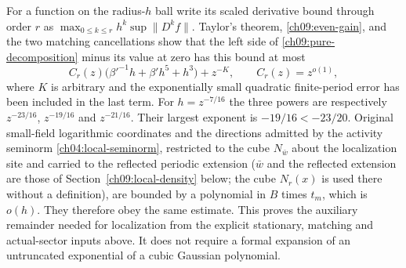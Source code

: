 For a function on the radius-$h$ ball write its scaled derivative
bound through order $r$ as
$\max_{0\le k\le r}h^k\sup\|D^kf\|$.
Taylor's theorem, \eqref{ch09:even-gain}, and the two matching
cancellations show that the left side of
\eqref{ch09:pure-decomposition} minus its value at zero has this bound at most
\begin{equation}
 C_r(z)\bigl(\beta'^{-1}h+\beta'h^5+h^3\bigr)+z^{-K},
 \qquad C_r(z)=z^{o(1)},
 \label{ch09:pure-small-bound}
\end{equation}
where $K$ is arbitrary and the exponentially small quadratic
finite-period error has been included in the last term.
For $h=z^{-7/16}$ the three powers are respectively
$z^{-23/16}$, $z^{-19/16}$ and $z^{-21/16}$.
Their largest exponent is $-19/16<-23/20$.
Original small-field logarithmic coordinates and the directions admitted by the activity
seminorm \eqref{ch04:local-seminorm}, restricted to the cube $N_{\bar w}$ about the localization site and carried to the reflected periodic extension ($\bar w$ and the reflected extension are those of Section~\ref{ch09:local-density} below; the cube $N_r(x)$ is used there without a definition), are bounded by a polynomial in $B$ times
$t_m$, which is $o(h)$. They therefore obey the same estimate.
This proves the auxiliary remainder needed for localization from
the explicit stationary, matching and actual-sector inputs above.
It does not require a formal expansion of an untruncated
exponential of a cubic Gaussian polynomial.
